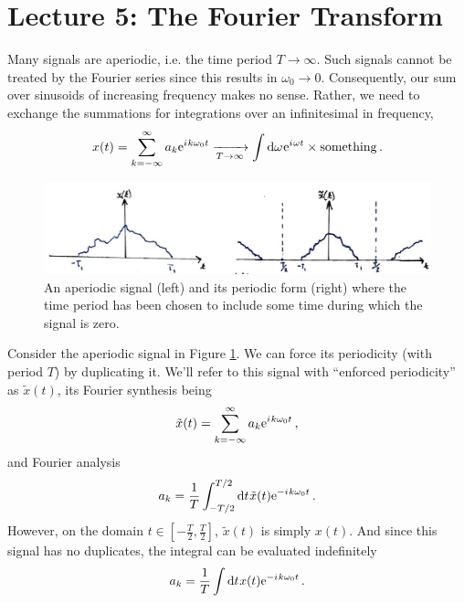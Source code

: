 \section{Lecture 5: The Fourier Transform}

Many signals are aperiodic, i.e. the time period $T \rightarrow\infty$. Such
signals cannot be treated by the Fourier series since this results in
$\omega_0\rightarrow 0$. Consequently, our sum over sinusoids of increasing
frequency makes no sense. Rather, we need to exchange the summations for
integrations over an infinitesimal in frequency,
%
\begin{displaymath}
  x(t) = \sum_{k=-\infty}^\infty a_k\mathrm{e}^{{i\mkern1mu} k\omega_0 t} \xrightarrow[T\rightarrow\infty]{}
  \int\mathrm{d}\omega\mkern1mu \mathrm{e}^{{i\mkern1mu}\omega t} \times \mathrm{something} \,.
\end{displaymath}
%
\begin{figure}[!htb]
  \includegraphics[width=\textwidth]{images/lecture_5_enforce_periodicity.JPG}
  \caption{
    An aperiodic signal (left) and its periodic form (right) where the time period
    has been chosen to include some time during which the signal is zero.
  }
  \label{fig::lecture_5_enforce_periodicity}
\end{figure}
%
Consider the aperiodic signal in Figure \ref{fig::lecture_5_enforce_periodicity}. We can force its periodicity (with
period $T$) by duplicating it. We'll refer to this
signal with ``enforced periodicity'' as $\tilde{x}(t)$, its Fourier synthesis
being
%
\begin{displaymath}
  \tilde{x}(t) = \sum_{k=-\infty}^\infty a_k\mathrm{e}^{{i\mkern1mu} k\omega_0 t} \,,
\end{displaymath}
%
and Fourier analysis
%
\begin{displaymath}
  a_k = \frac{1}{T}\int_{-T/2}^{T/2} \mathrm{d}t\mkern1mu \tilde{x}(t)\mathrm{e}^{-{i\mkern1mu} k\omega_0 t} \,.
\end{displaymath}
%
However, on the domain $t\in[-\frac{T}{2},\frac{T}{2}]$, $\tilde{x}(t)$ is simply $x(t)$.
And since this signal has no duplicates, the integral can be evaluated indefinitely
%
\begin{displaymath}
  a_k = \frac{1}{T}\int \mathrm{d}t\mkern1mu x(t)\mathrm{e}^{-{i\mkern1mu} k\omega_0 t} \,.
\end{displaymath}
